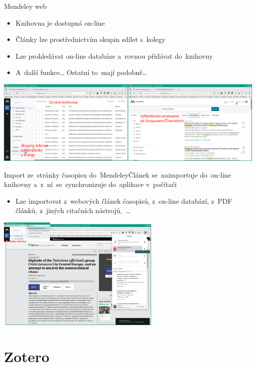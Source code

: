 \documentclass[compress, xelatex, 11pt, xcolor=svgnames, aspectratio=169,
	hyperref={
		bookmarks=true,
		unicode=true,
		colorlinks=true,
		pdftitle={Citacni software},
		plainpages=false,
		pdfauthor={Vojtech Zeisek},
		pdfsubject={Kratky uvod do citacniho software},
		pdfcreator={XeLaTeX},
		pdfkeywords={citace, reference, software, literatura},
		linkcolor=Crimson, %
		anchorcolor=Magenta, %
		citecolor=Magenta, %
		filecolor=Magenta, %
		menucolor=Magenta, %
		urlcolor=DarkTurquoise, %
		},
	url={hyphens, lowtilde} %
	]{beamer}
\begin{document}
\begin{frame}{Mendeley web}
	\begin{itemize}
		\item Knihovna je dostupná on-line
		\item Články lze prostřednictvím skupin sdílet s~kolegy
		\item Lze prohledávat on-line databáze a~rovnou přidávat do~knihovny
		\item A~další funkce\ldots{ }Ostatní to~mají podobně\ldots
	\end{itemize}
	\includegraphics[width=\textwidth]{mendeley_web.png}
\end{frame}

\begin{frame}{Import ze~stránky časopisu do~Mendeley}{Článek se~naimportuje do~on-line knihovny a~z~ní~se~synchronizuje do~aplikace v~počítači}
	\begin{itemize}
		\item Lze importovat z~webových článek časopisů, z~on-line databází, z~PDF článků, z~jiných citačních nástrojů,~\ldots
	\end{itemize}
	\begin{center}
		\includegraphics[height=5.5cm]{mendeley_web_import.png}
	\end{center}
\end{frame}

\section{Zotero}
\end{document}
